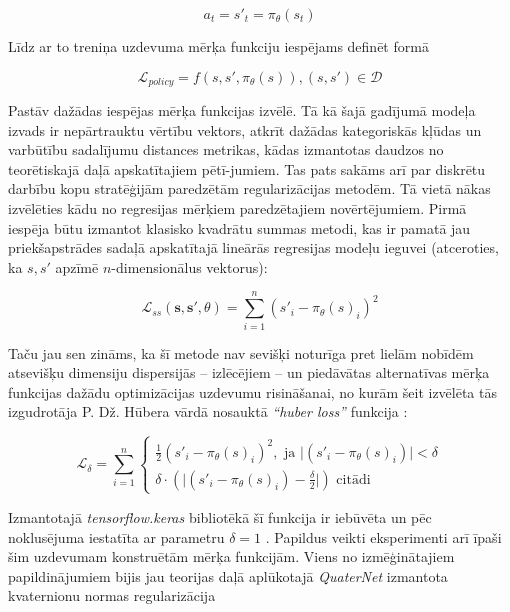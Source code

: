 \documentclass[12pt, a4paper]{article}
\numberwithin{equation}{section} %
\begin{document}
\begin{equation}
    a_t = s'_t = \pi_{\theta}(s_t)
\end{equation}

Līdz ar to treniņa uzdevuma mērķa funkciju iespējams definēt formā

\begin{equation}
    \mathcal{L}_{policy} = f \left (s,s',\pi_{\theta}(s) \right ), (s,s') \in \mathcal{D}
\end{equation}

Pastāv dažādas iespējas mērķa funkcijas izvēlē. Tā kā šajā gadījumā modeļa izvads ir nepārtrauktu vērtību vektors, atkrīt dažādas kategoriskās kļūdas un varbūtību sadalījumu distances metrikas, kādas izmantotas daudzos no teorētiskajā daļā apskatītajiem pētī-jumiem. Tas pats sakāms arī par diskrētu darbību kopu stratēģijām paredzētām regularizācijas metodēm. Tā vietā nākas izvēlēties kādu no regresijas mērķiem paredzētajiem novērtējumiem. Pirmā iespēja būtu izmantot klasisko kvadrātu summas metodi, kas ir pamatā jau priekšapstrādes sadaļā apskatītajā lineārās regresijas modeļu ieguvei (atceroties, ka $s, s'$ apzīmē $n$-dimensionālus vektorus):


\begin{equation}
    \mathcal{L}_{ss} ( \boldsymbol{s}, \boldsymbol{s'},\theta) = \sum_{i=1}^n (s'_i - \pi_{\theta}(s)_i)^2 
\end{equation}

Taču jau sen zināms, ka šī metode nav sevišķi noturīga pret lielām nobīdēm atsevišķu dimensiju dispersijās -- izlēcējiem -- un piedāvātas alternatīvas mērķa funkcijas dažādu optimizācijas uzdevumu risināšanai, no kurām šeit izvēlēta tās izgudrotāja P. Dž. Hūbera vārdā nosauktā \textit{``huber loss''} funkcija \cite{huber_loss}:


\begin{equation}
    \mathcal{L}_{\delta} =  \sum_{i=1}^n 
    \begin{cases}
    \frac{1}{2} (s'_i - \pi_{\theta}(s)_i)^2, \text{ ja } \vert (s'_i - \pi_{\theta}(s)_i) \vert < \delta \\
    \delta \cdot \left (  \vert (s'_i - \pi_{\theta}(s)_i) - \frac{\delta}{2} \vert  \right ) \text{ citādi}
    \end{cases}
\end{equation}


Izmantotajā \textit{tensorflow.keras} bibliotēkā šī funkcija ir iebūvēta un pēc noklusējuma iestatīta ar parametru $\delta = 1$ \cite{keras_huber}. Papildus veikti eksperimenti arī īpaši šim uzdevumam konstruētām mērķa funkcijām. Viens no izmēģinātajiem papildinājumiem bijis jau teorijas daļā aplūkotajā \textit{QuaterNet} izmantota kvaternionu normas regularizācija \cite{pavllo2018quaternet}
\end{document}
